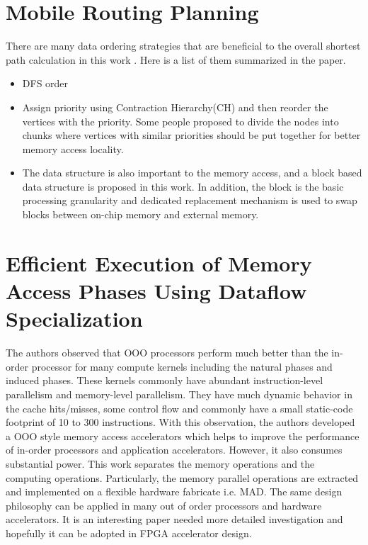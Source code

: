 \section{Mobile Routing Planning}
There are many data ordering strategies that are beneficial to the overall
shortest path calculation in this work \cite{sanders2008mobile}. Here is a list
of them summarized in the paper.
\begin{itemize}
    \item DFS order
    \item Assign priority using Contraction Hierarchy(CH) and then reorder the
        vertices with the priority. Some people proposed to divide the nodes
        into chunks where vertices with similar priorities should be put
        together for better memory access locality.
    \item The data structure is also important to the memory access, and a block
        based data structure is proposed in this work. In addition, the block is
        the basic processing granularity and dedicated replacement mechanism is
        used to swap blocks between on-chip memory and external memory.
\end{itemize}

\section{Efficient Execution of Memory Access Phases Using Dataflow
Specialization}
The authors observed \cite{ho2015efficient} that OOO processors perform much better than the in-order
processor for many compute kernels including the natural phases and induced
phases. These kernels commonly have abundant instruction-level parallelism and
memory-level parallelism. They have much dynamic behavior in the cache
hits/misses, some control flow and commonly have a small static-code footprint
of 10 to 300 instructions. With this observation, the authors developed a OOO
style memory access accelerators which helps to improve the performance of
in-order processors and application accelerators. However, it also consumes
substantial power. This work separates the memory operations and the computing
operations. Particularly, the memory parallel operations are extracted and
implemented on a flexible hardware fabricate i.e. MAD. The same design
philosophy can be applied in many out of order processors and hardware
accelerators. It is an interesting paper needed more detailed investigation and
hopefully it can be adopted in FPGA accelerator design.

